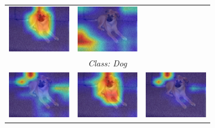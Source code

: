 \begin{figure}[!t]
{\begin{minipage}{0.9\textwidth}
\begin{subfigure}[t]{0.48\textwidth}
\begin{tabular}{c c c}
          \includegraphics[width=0.32\linewidth, height=0.32\linewidth]{figures/cams/layercam/2010_001933_11} &
          \includegraphics[width=0.32\linewidth, height=0.32\linewidth]{figures/cams/gradcampp/2010_001933_11} \\
          \multicolumn{3}{c}{{\scriptsize \textit{Class: Dog}}} \\[2pt]
          \includegraphics[width=0.32\linewidth, height=0.32\linewidth]{figures/cams/gradcam/2010_001933_17} &
          \includegraphics[width=0.32\linewidth, height=0.32\linewidth]{figures/cams/layercam/2010_001933_17} &
          \includegraphics[width=0.32\linewidth, height=0.32\linewidth]{figures/cams/gradcampp/2010_001933_17} \\

\end{tabular}
\end{subfigure}
\end{minipage}}
\end{figure}
